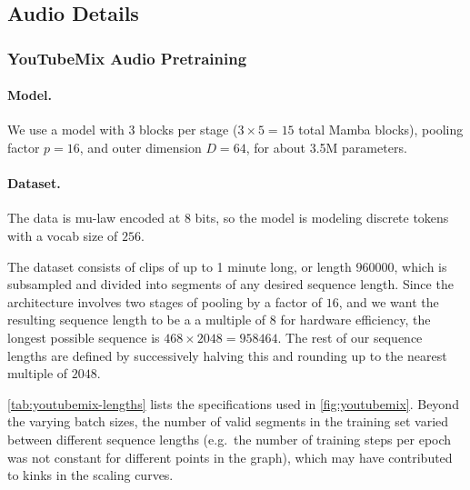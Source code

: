 \subsection{Audio Details}
\label{sec:exp-details:audio}

%

\subsubsection{YouTubeMix Audio Pretraining}

%

%

%


\paragraph{Model.}
We use a model with 3 blocks per stage ($3\times5=15$ total Mamba blocks), pooling factor $p=16$, and outer dimension $D=64$, for about 3.5M parameters.

\paragraph{Dataset.}
The data is mu-law encoded at 8 bits, so the model is modeling discrete tokens with a vocab size of $256$.

%
The dataset consists of clips of up to 1 minute long, or length $960000$,
which is subsampled and divided into segments of any desired sequence length.
Since the architecture involves two stages of pooling by a factor of $16$,
and we want the resulting sequence length to be a a multiple of $8$ for hardware efficiency,
the longest possible sequence is $468 \times 2048 = 958464$.
The rest of our sequence lengths are defined by successively halving this and rounding up to the nearest multiple of $2048$.

\cref{tab:youtubemix-lengths} lists the specifications used in \cref{fig:youtubemix}.
Beyond the varying batch sizes, the number of valid segments in the training set varied
between different sequence lengths (e.g.\ the number of training steps per epoch was not constant for different points in the graph), which may have contributed to kinks in the scaling curves.

